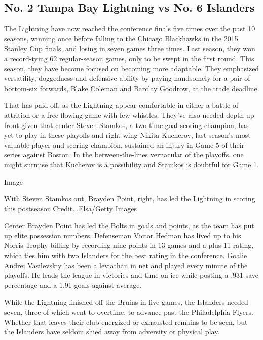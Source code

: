 \hypertarget{no-2-tampa-bay-lightning-vs-no-6-islanders}{%
\subsection{No. 2 Tampa Bay Lightning vs No. 6
Islanders}\label{no-2-tampa-bay-lightning-vs-no-6-islanders}}

The Lightning have now reached the conference finals five times over the
past 10 seasons, winning once before falling to the Chicago Blackhawks
in the 2015 Stanley Cup finals, and losing in seven games three times.
Last season, they won a record-tying 62 regular-season games, only to be
swept in the first round. This season, they have become focused on
becoming more adaptable. They emphasized versatility, doggedness and
defensive ability by paying handsomely for a pair of bottom-six
forwards, Blake Coleman and Barclay Goodrow, at the trade deadline.

That has paid off, as the Lightning appear comfortable in either a
battle of attrition or a free-flowing game with few whistles. They've
also needed depth up front given that center Steven Stamkos, a two-time
goal-scoring champion, has yet to play in these playoffs and right wing
Nikita Kucherov, last season's most valuable player and scoring
champion, sustained an injury in Game 5 of their series against Boston.
In the between-the-lines vernacular of the playoffs, one might surmise
that Kucherov is a possibility and Stamkos is doubtful for Game 1.

Image

With Steven Stamkos out, Brayden Point, right, has led the Lightning in
scoring this postseason.Credit...Elsa/Getty Images

Center Brayden Point has led the Bolts in goals and points, as the team
has put up elite possession numbers. Defenseman Victor Hedman has lived
up to his Norris Trophy billing by recording nine points in 13 games and
a plus-11 rating, which ties him with two Islanders for the best rating
in the conference. Goalie Andrei Vasilevskiy has been a leviathan in net
and played every minute of the playoffs. He leads the league in
victories and time on ice while posting a .931 save percentage and a
1.91 goals against average.

While the Lightning finished off the Bruins in five games, the Islanders
needed seven, three of which went to overtime, to advance past the
Philadelphia Flyers. Whether that leaves their club energized or
exhausted remains to be seen, but the Islanders have seldom shied away
from adversity or physical play.

